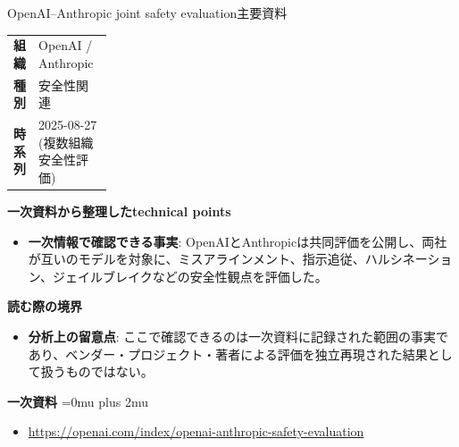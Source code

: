 \begin{technicalnote}{OpenAI–Anthropic joint safety evaluation}{主要資料}
\begingroup
\begin{tabularx}{\linewidth}{@{}>{\bfseries}p{0.22\linewidth}X@{}}
組織 & OpenAI / Anthropic \\
種別 & 安全性関連 \\
時系列 & 2025-08-27 (複数組織安全性評価) \\
\end{tabularx}
\smallskip
{\bfseries 一次資料から整理したtechnical points}
\begin{itemize}[leftmargin=1.5em,itemsep=0.35em]
\item \textbf{一次情報で確認できる事実}: OpenAIとAnthropicは共同評価を公開し、両社が互いのモデルを対象に、ミスアラインメント、指示追従、ハルシネーション、ジェイルブレイクなどの安全性観点を評価した。
\end{itemize}
\begin{minipage}{\linewidth}
{\bfseries 読む際の境界}
\begin{itemize}[leftmargin=1.5em,itemsep=0.35em]
\item \textbf{分析上の留意点}: ここで確認できるのは一次資料に記録された範囲の事実であり、ベンダー・プロジェクト・著者による評価を独立再現された結果として扱うものではない。
\end{itemize}
\begin{samepage}
{\bfseries 一次資料}
\begingroup\sloppy
\Urlmuskip=0mu plus 2mu\relax
\begin{itemize}[leftmargin=1.5em,itemsep=0.25em]
\item {\scriptsize\url{https://openai.com/index/openai-anthropic-safety-evaluation}}
\end{itemize}
\endgroup
\end{samepage}
\end{minipage}
\endgroup
\end{technicalnote}
\medskip

